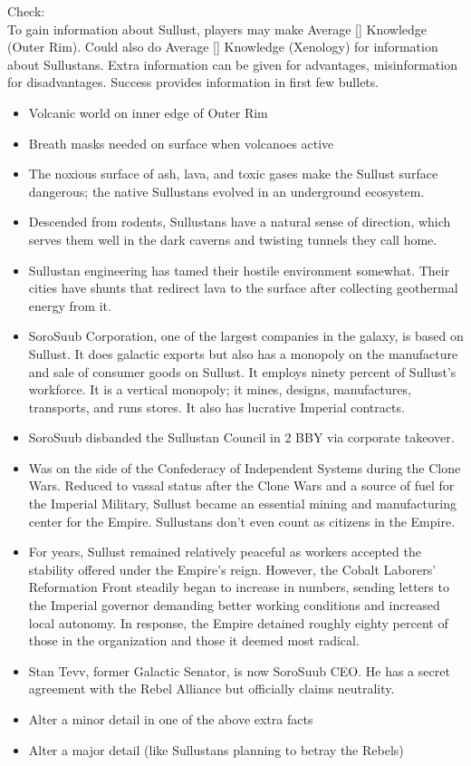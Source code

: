 \documentclass{book}
\newcommand{\df}{\difficulty}
\begin{document}
\begin{multicols}{2}
Check:\\
To gain information about Sullust, players may make Average [\df\df] Knowledge (Outer Rim). Could also do Average [\df\df] Knowledge (Xenology) for information about Sullustans. Extra information can be given for advantages, misinformation for disadvantages. Success provides information in first few bullets.\\
\begin{itemize}
    \item Volcanic world on inner edge of Outer Rim
    \item Breath masks needed on surface when volcanoes active
    \item The noxious surface of ash, lava, and toxic gases make the Sullust surface dangerous; the native Sullustans evolved in an underground ecosystem.
    \item \advantage Descended from rodents, Sullustans have a natural sense of direction, which serves them well in the dark caverns and twisting tunnels they call home.
    \item \advantage  Sullustan engineering has tamed their hostile environment somewhat. Their cities have shunts that redirect lava to the surface after collecting geothermal energy from it.
   \item \advantage SoroSuub Corporation, one of the largest companies in the galaxy, is based on Sullust. It does galactic exports but also has a monopoly on the manufacture and sale of consumer goods on Sullust. It employs ninety percent of Sullust’s workforce. It is a vertical monopoly; it mines, designs, manufactures, transports, and runs stores. It also has lucrative Imperial contracts.
	\item \advantage SoroSuub disbanded the Sullustan Council in 2 BBY via corporate takeover.
    \item \advantage Was on the side of the Confederacy of Independent Systems during the Clone Wars. Reduced to vassal status after the Clone Wars and a source of fuel for the Imperial Military, Sullust became an essential mining and manufacturing center for the Empire. Sullustans don’t even count as citizens in the Empire.
    \item \advantage For years, Sullust remained relatively peaceful as workers accepted the stability offered under the Empire's reign. However, the Cobalt Laborers' Reformation Front steadily began to increase in numbers, sending letters to the Imperial governor demanding better working conditions and increased local autonomy. In response, the Empire detained roughly eighty percent of those in the organization and those it deemed most radical.
    \item \triumph Stan Tevv, former Galactic Senator, is now SoroSuub CEO.  He has a secret agreement with the Rebel Alliance but officially claims neutrality.
    \item \threat Alter a minor detail in one of the above extra facts
    \item \despair Alter a major detail (like Sullustans planning to betray the Rebels)
\end{itemize}




\end{multicols}
\end{document}
